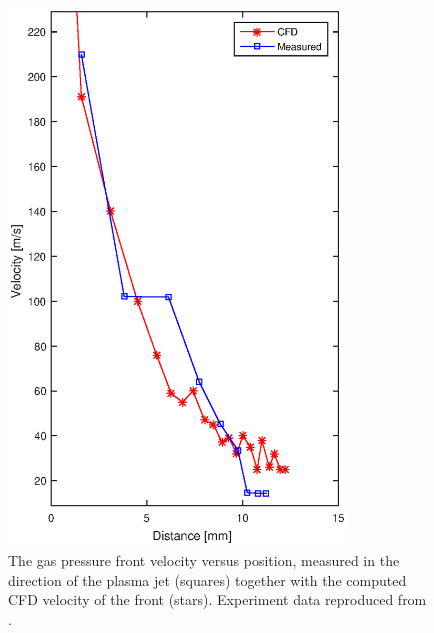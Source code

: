 \documentclass[a4paper]{iacas}%
\begin{document}
\begin{figure}
		\centering
	\begin{minipage}[t]{0.48\textwidth}
		\centering
		\includegraphics[width=0.8\textwidth]{ModelJetVelocity.eps}
		\caption{The gas pressure front velocity versus position, measured in the direction of the plasma jet (squares) together with the computed CFD velocity of the front (stars). Experiment data reproduced from \cite{KR}.}
		\label{fig:model_velocity}
	\end{minipage}\hfill
	\begin{minipage}[t]{0.48\textwidth}
		\centering

\end{minipage}
\end{figure}
\end{document}
